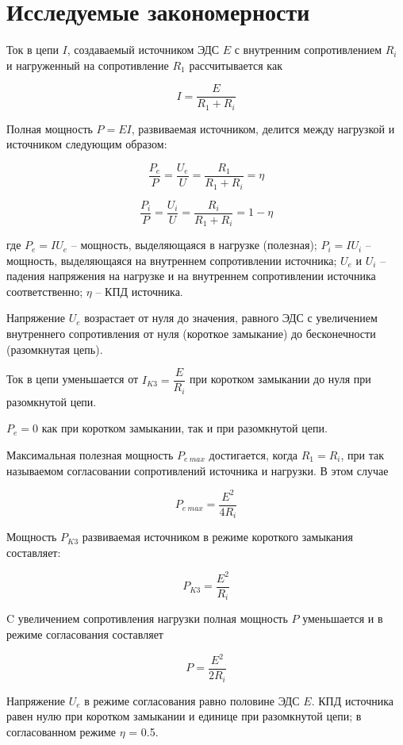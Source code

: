 \section*{Исследуемые закономерности}

Ток в цепи $ I $, создаваемый источником ЭДС $ E $ с внутренним сопротивлением $ R_i $
и нагруженный на сопротивление $ R_1 $ рассчитывается как 

\begin{equation}
	I = \dfrac{E}{R_1 + R_i}
\end{equation}

Полная мощность $ P = EI $, развиваемая источником, делится между
нагрузкой и источником следующим образом: 


\begin{equation}
    \dfrac{P_e}{P} = \dfrac{U_e}{U} = \dfrac{R_1}{R_1 + R_i} = \eta
\end{equation}

\begin{equation}
	\dfrac{P_i}{P} = \dfrac{U_i}{U} = \dfrac{R_i}{R_1 + R_i} = 1 - \eta
\end{equation}

где $ P_e = IU_e $ – мощность, выделяющаяся в нагрузке (полезная); $ P_i = IU_i $  –
мощность, выделяющаяся на внутреннем сопротивлении источника;
$ U_e $ и $ U_i $ – падения напряжения на нагрузке и на внутреннем сопротивлении
источника соответственно; $ \eta $ -- КПД источника. 

Напряжение $ U_e $ возрастает
от нуля до значения, равного ЭДС
с увеличением внутреннего сопротивления от нуля (короткое
замыкание) до бесконечности (разомкнутая цепь).

Ток в цепи уменьшается от $ I_{K3} = \dfrac{E}{R_i} $
при коротком замыкании до нуля при разомкнутой цепи.

$ P_e = 0 $ как при коротком замыкании, так и при
разомкнутой цепи.

Максимальная полезная мощность $ P_{e\ max} $ достигается,
когда $ R_1 = R_i $, при так называемом согласовании сопротивлений источника и
нагрузки. В этом случае 


\begin{equation}
	P_{e\ max} = \dfrac{E^2}{4R_i}
\end{equation}

Мощность $ P_{K3} $ развиваемая источником в режиме короткого замыкания составляет:

\begin{equation}
	 P_{K3} = \dfrac{E^2}{R_i}
\end{equation}

C увеличением сопротивления нагрузки полная мощность $ P $ уменьшается и в режиме согласования составляет 

\begin{equation}
	P = \dfrac{E^2}{2R_i}
\end{equation}

Напряжение $ U_e $ в режиме согласования равно половине ЭДС $ E $. КПД
источника равен нулю при коротком замыкании и единице при разомкнутой
цепи; в согласованном режиме $ \eta $ = 0.5.

 